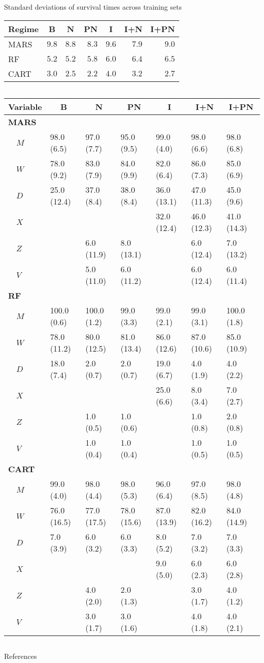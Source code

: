 \documentclass[handout]{beamer}
\begin{document}
\begin{frame}{Standard deviations of survival times across training sets}
  \begin{table}[!htbp]
  \centering
  \begin{tabular}{lrrrrrr}
  \toprule \multicolumn{1}{c}{Regime}&\multicolumn{1}{c}{B}&\multicolumn{1}{c}{N}&\multicolumn{1}{c}{PN}&\multicolumn{1}{c}{I}&\multicolumn{1}{c}{I+N}&\multicolumn{1}{c}{I+PN}\tabularnewline
  \midrule
  MARS&$9.8$&$8.8$&$8.3$&$9.6$&$7.9$&$9.0$\tabularnewline
  RF&$5.2$&$5.2$&$5.8$&$6.0$&$6.4$&$6.5$\tabularnewline
  CART&$3.0$&$2.5$&$2.2$&$4.0$&$3.2$&$2.7$\tabularnewline
  \bottomrule
  \end{tabular}
  \end{table}
\end{frame}

\begin{frame}[c]{}
  \begin{columns}
    \column{\dimexpr\paperwidth}
\begin{table}
\scriptsize
\centering
\begin{tabular}{lllllll}
\toprule
\multicolumn{1}{l}{Variable}&\multicolumn{1}{c}{B}&\multicolumn{1}{c}{N}&\multicolumn{1}{c}{PN}&\multicolumn{1}{c}{I}&\multicolumn{1}{c}{I+N}&\multicolumn{1}{c}{I+PN}\tabularnewline
\midrule
{\bfseries MARS}&&&&&&\tabularnewline
~~$M$&98.0 (6.5)&97.0 (7.7)&95.0 (9.5)&99.0 (4.0)&98.0 (6.6)&98.0 (6.8)\tabularnewline
~~$W$&78.0 (9.2)&83.0 (7.9)&84.0 (9.9)&82.0 (6.4)&86.0 (7.3)&85.0 (6.9)\tabularnewline
~~$D$&25.0 (12.4)&37.0 (8.4)&38.0 (8.4)&36.0 (13.1)&47.0 (11.3)&45.0 (9.6)\tabularnewline
~~$X$&&&&32.0 (12.4)&46.0 (12.3)&41.0 (14.3)\tabularnewline
~~$Z$&&6.0 (11.9)&8.0 (13.1)&&6.0 (12.4)&7.0 (13.2)\tabularnewline
~~$V$&&5.0 (11.0)&6.0 (11.2)&&6.0 (12.4)&6.0 (11.4)\tabularnewline
\midrule
{\bfseries RF}&&&&&&\tabularnewline
~~$M$&100.0 (0.6)&100.0 (1.2)&99.0 (3.3)&99.0 (2.1)&99.0 (3.1)&100.0 (1.8)\tabularnewline
~~$W$&78.0 (11.2)&80.0 (12.5)&81.0 (13.4)&86.0 (12.6)&87.0 (10.6)&85.0 (10.9)\tabularnewline
~~$D$&18.0 (7.4)&2.0 (0.7)&2.0 (0.7)&19.0 (6.7)&4.0 (1.9)&4.0 (2.2)\tabularnewline
~~$X$&&&&25.0 (6.6)&8.0 (3.4)&7.0 (2.7)\tabularnewline
~~$Z$&&1.0 (0.5)&1.0 (0.6)&&1.0 (0.8)&2.0 (0.8)\tabularnewline
~~$V$&&1.0 (0.4)&1.0 (0.4)&&1.0 (0.5)&1.0 (0.5)\tabularnewline
\midrule
{\bfseries CART}&&&&&&\tabularnewline
~~$M$&99.0 (4.0)&98.0 (4.4)&98.0 (5.3)&96.0 (6.4)&97.0 (8.5)&98.0 (4.8)\tabularnewline
~~$W$&76.0 (16.5)&77.0 (17.5)&78.0 (15.6)&87.0 (13.9)&82.0 (16.2)&84.0 (14.9)\tabularnewline
~~$D$&7.0 (3.9)&6.0 (3.2)&6.0 (3.3)&8.0 (5.2)&7.0 (3.2)&7.0 (3.3)\tabularnewline
~~$X$&&&&9.0 (5.0)&6.0 (2.3)&6.0 (2.8)\tabularnewline
~~$Z$&&4.0 (2.0)&2.0 (1.3)&&3.0 (1.7)&4.0 (1.2)\tabularnewline
~~$V$&&3.0 (1.7)&3.0 (1.6)&&4.0 (1.8)&4.0 (2.1)\tabularnewline
\bottomrule
\end{tabular}
\end{table}
  \end{columns}
\end{frame}



\begin{frame}[allowframebreaks]{References}

\printbibliography[heading=none]

\end{frame}
\end{document}
